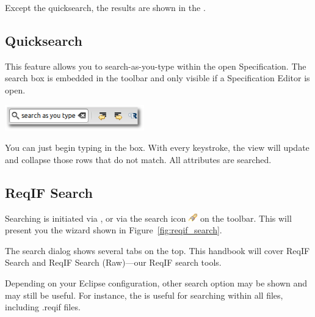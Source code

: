 Except the quicksearch, the results are shown in the .

\subsection{Quicksearch}
\label{sec:quicksearch}

This feature allows you to search-as-you-type within the open Specification.  The search box is embedded in the toolbar and only visible if a Specification Editor is open.

\begin{center}
\includegraphics[height=3em]{../rmf-images/quicksearch.png}
\end{center}

You can just begin typing in the box.  With every keystroke, the view will update and collapse those rows that do not match.  All attributes are searched.

\subsection{ReqIF Search}
\label{sec:reqif-search}

Searching is initiated via , or via the search icon \includegraphics[height=1em]{../rmf-images/icons/full/obj16/search.png} on the toolbar.  This will present you the wizard shown in Figure~\ref{fig:reqif_search}.

\begin{info}
The search dialog shows several tabs on the top.  This handbook will cover ReqIF Search and ReqIF Search (Raw)---our ReqIF search tools.  

Depending on your Eclipse configuration, other search option may be shown and may still be useful.  For instance, the  is useful for searching within all files, including .reqif files.
\end{info}

